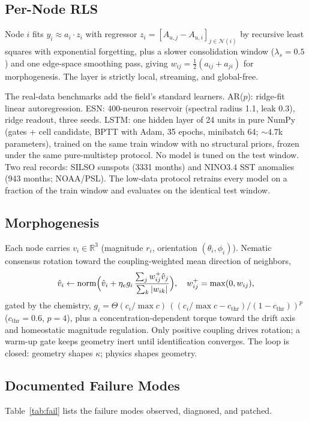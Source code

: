 \documentclass[conference]{IEEEtran}
\begin{document}
\subsection{Per-Node RLS}
Node $i$ fits $y_i \approx a_i \cdot z_i$ with regressor
$z_i = [A_{u,j} - A_{u,i}]_{j \in \mathcal{N}(i)}$ by recursive least squares with
exponential forgetting, plus a slower consolidation window ($\lambda_s = 0.5$) and one
edge-space smoothing pass, giving $w_{ij} = \tfrac{1}{2}(a_{ij} + a_{ji})$ for
morphogenesis. The layer is strictly local, streaming, and global-free.

The real-data benchmarks add the field's standard learners. AR($p$): ridge-fit
linear autoregression. ESN: 400-neuron reservoir (spectral radius 1.1, leak 0.3),
ridge readout, three seeds. LSTM: one hidden layer of 24 units in pure NumPy
(gates + cell candidate, BPTT with Adam, 35 epochs, minibatch 64; ${\sim}4.7$k
parameters), trained on the same train window with no structural priors, frozen
under the same pure-multistep protocol. No model is tuned on the test window.
Two real records: SILSO sunspots (3331 months) and NINO3.4 SST anomalies (943
months; NOAA/PSL). The low-data protocol retrains every model on a fraction of
the train window and evaluates on the identical test window.

\subsection{Morphogenesis}
Each node carries $v_i \in \mathbb{R}^3$ (magnitude $r_i$, orientation
$(\theta_i,\phi_i)$). Nematic consensus rotation toward the coupling-weighted mean
direction of neighbors,
\begin{equation}
\hat v_i \leftarrow \mathrm{norm}\Bigl(\hat v_i + \eta_e g_i\,
\frac{\sum_j w_{ij}^{+}\hat v_j}{\sum_k |w_{ik}|}\Bigr), \quad
w_{ij}^{+} = \max(0, w_{ij}),
\end{equation}
gated by the chemistry, $g_i = \Theta(c_i/\max c)\,((c_i/\max c - c_{\mathrm{thr}})/
(1 - c_{\mathrm{thr}}))^{p}$ ($c_{\mathrm{thr}} = 0.6$, $p = 4$), plus a
concentration-dependent torque toward the drift axis and homeostatic magnitude
regulation. Only positive coupling drives rotation; a warm-up gate keeps geometry inert
until identification converges. The loop is closed: geometry shapes $\kappa$; physics
shapes geometry.

\subsection{Documented Failure Modes}
Table~\ref{tab:fail} lists the failure modes observed, diagnosed, and patched.
\end{document}

